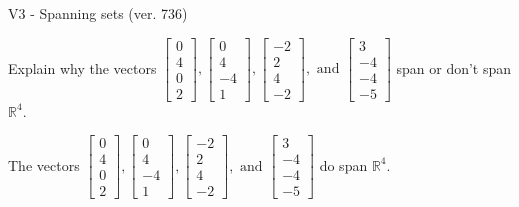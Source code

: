 \begin{exercise}
  \begin{exerciseTitle}V3 - Spanning sets (ver. 736)\end{exerciseTitle}
  \begin{exerciseStatement}
    Explain why the vectors \(\left[\begin{array}{r}
0 \\
4 \\
0 \\
2
\end{array}\right] , \left[\begin{array}{r}
0 \\
4 \\
-4 \\
1
\end{array}\right] , \left[\begin{array}{r}
-2 \\
2 \\
4 \\
-2
\end{array}\right] , \text{ and } \left[\begin{array}{r}
3 \\
-4 \\
-4 \\
-5
\end{array}\right]\) span or don't span \(\mathbb{R}^4\). 
	


  \end{exerciseStatement}
  \begin{exerciseAnswer}
   The vectors \(\left[\begin{array}{r}
0 \\
4 \\
0 \\
2
\end{array}\right] , \left[\begin{array}{r}
0 \\
4 \\
-4 \\
1
\end{array}\right] , \left[\begin{array}{r}
-2 \\
2 \\
4 \\
-2
\end{array}\right] , \text{ and } \left[\begin{array}{r}
3 \\
-4 \\
-4 \\
-5
\end{array}\right]\) 
  	 do  
	span \(\mathbb{R}^4\).
  


  \end{exerciseAnswer}
\end{exercise}